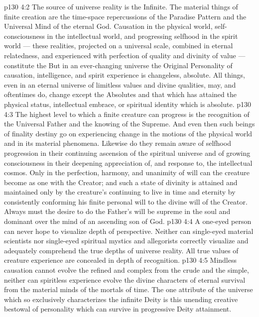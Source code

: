 \vs p130 4:2 \pc The source of universe reality is the Infinite. The material things of finite creation are the time\hyp{}space repercussions of the Paradise Pattern and the Universal Mind of the eternal God. Causation in the physical world, self\hyp{}consciousness in the intellectual world, and progressing selfhood in the spirit world --- these realities, projected on a universal scale, combined in eternal relatedness, and experienced with perfection of quality and divinity of value --- constitute the  But in an ever\hyp{}changing universe the Original Personality of causation, intelligence, and spirit experience is changeless, absolute. All things, even in an eternal universe of limitless values and divine qualities, may, and oftentimes do, change except the Absolutes and that which has attained the physical status, intellectual embrace, or spiritual identity which is absolute.
\vs p130 4:3 The highest level to which a finite creature can progress is the recognition of the Universal Father and the knowing of the Supreme. And even then such beings of finality destiny go on experiencing change in the motions of the physical world and in its material phenomena. Likewise do they remain aware of selfhood progression in their continuing ascension of the spiritual universe and of growing consciousness in their deepening appreciation of, and response to, the intellectual cosmos. Only in the perfection, harmony, and unanimity of will can the creature become as one with the Creator; and such a state of divinity is attained and maintained only by the creature’s continuing to live in time and eternity by consistently conforming his finite personal will to the divine will of the Creator. Always must the desire to do the Father’s will be supreme in the soul and dominant over the mind of an ascending son of God.
\vs p130 4:4 A one\hyp{}eyed person can never hope to visualize depth of perspective. Neither can single\hyp{}eyed material scientists nor single\hyp{}eyed spiritual mystics and allegorists correctly visualize and adequately comprehend the true depths of universe reality. All true values of creature experience are concealed in depth of recognition.
\vs p130 4:5 Mindless causation cannot evolve the refined and complex from the crude and the simple, neither can spiritless experience evolve the divine characters of eternal survival from the material minds of the mortals of time. The one attribute of the universe which so exclusively characterizes the infinite Deity is this unending creative bestowal of personality which can survive in progressive Deity attainment.
